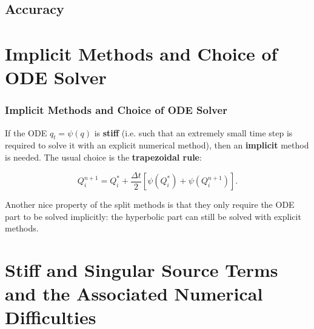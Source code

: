 \documentclass{beamer}
\renewcommand{\d}{\Delta}
\renewcommand{\emph}[1]{\textcolor{tum}{\textbf{#1}}}
\begin{document}
\subsection{Accuracy}
















\section{Implicit Methods and Choice of ODE Solver}

\begin{frame}
	\frametitle{Implicit Methods and Choice of ODE Solver}
	If the ODE $q_t=\psi(q)$ is \emph{stiff} (i.e. such that an extremely small time step is required to solve it with an explicit numerical method), then an \emph{implicit} method is needed. The usual choice is the \emph{trapezoidal rule}:

	\begin{equation}\label{eq:trapezoidal}
		Q_i^{n+1} = Q_i^*+\frac{\d t}{2}[\psi(Q_i^*)+\psi(Q_i^{n+1})].
	\end{equation}

	Another nice property of the split methods is that they only require the ODE part to be solved implicitly: the hyperbolic part can still be solved with explicit methods.
\end{frame}













\section{Stiff and Singular Source Terms and the Associated Numerical Difficulties}
\end{document}

